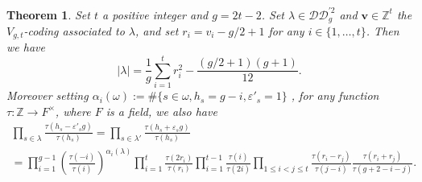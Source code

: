 \documentclass[11pt,letterpaper]{amsart}
\def\bbbz{\mathbb Z}
\def\cch{\mathcal H}
\def\ccdd{\mathcal {DD}}
\newtheorem{thm}[df]{Theorem}
\numberwithin{equation}{section}
\numberwithin{df}{section}
\begin{document}
\begin{thm}\label{thm:DDtquotpaird}
Set $t$ a positive integer and $g=2t-2$. Set $\lambda\in \ccdd_{g}^{'2}$ and $\mathbf{v}\in\bbbz^{t}$ the $V_{g,t}$-coding associated to $\lambda$, and set $r_i=v_i-g/2+1$ for any $i\in\lbrace1,\dots,t\rbrace$. Then we have
$$\lvert \lambda\rvert = \frac{1}{g}\sum_{i=1}^{t} r_i^2-\frac{(g/2+1)(g+1)}{12}.$$
Moreover setting $\alpha_i(\omega):=\#\lbrace s\in\omega, h_s=g-i, \varepsilon'_s=1\rbrace$ , for any function $\tau:\bbbz\rightarrow F^{\times}$, where $F$ is a field, we also have
\begin{multline*}\label{eq:thmddprimepairtquotd}
\prod_{s\in\lambda}\frac{\tau(h_s-\varepsilon'_s g)}{\tau(h_s)}=\prod_{s\in\lambda'}\frac{\tau(h_s+\varepsilon_s g)}{\tau(h_s)}\\
=\prod_{i=1}^{g-1}\left(\frac{\tau(-i)}{\tau(i)}\right)^{\alpha_i(\lambda)}\prod_{i=1}^t\frac{\tau(2r_i)}{\tau(r_i)}\prod_{i=1}^{t-1}\frac{\tau(i)}{\tau(2i)}
\prod_{1\leq i<j\leq t} \frac{\tau(r_i-r_j)}{\tau(j-i)} \frac{\tau(r_i+r_j)}{\tau(g+2-i-j)}.
\end{multline*}

\end{thm}
\end{document}
